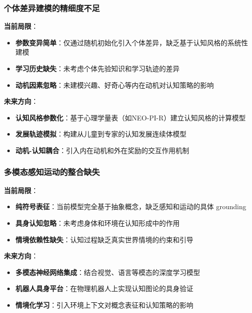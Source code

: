 \documentclass[12pt,a4paper]{article}
\begin{document}
\subsubsection{个体差异建模的精细度不足}

\textbf{当前局限}：
\begin{itemize}
\item \textbf{参数变异简单}：仅通过随机初始化引入个体差异，缺乏基于认知风格的系统性建模
\item \textbf{学习历史缺失}：未考虑个体先验知识和学习轨迹的差异
\item \textbf{动机因素忽略}：未建模兴趣、好奇心等内在动机对认知策略的影响
\end{itemize}

\textbf{未来方向}：
\begin{itemize}
\item \textbf{认知风格参数化}：基于心理学量表（如NEO-PI-R）建立认知风格的计算模型
\item \textbf{发展轨迹模拟}：构建从儿童到专家的认知发展连续体模型
\item \textbf{动机-认知耦合}：引入内在动机和外在奖励的交互作用机制
\end{itemize}

\subsubsection{多模态感知运动的整合缺失}

\textbf{当前局限}：
\begin{itemize}
\item \textbf{纯符号表征}：当前模型完全基于抽象概念，缺乏感知和运动的具体 grounding
\item \textbf{具身认知忽略}：未考虑身体和环境在认知形成中的作用
\item \textbf{情境依赖性缺失}：认知过程缺乏真实世界情境的约束和引导
\end{itemize}

\textbf{未来方向}：
\begin{itemize}
\item \textbf{多模态神经网络集成}：结合视觉、语言等模态的深度学习模型
\item \textbf{机器人具身平台}：在物理机器人上实现认知图论的具身验证
\item \textbf{情境化学习}：引入环境上下文对概念表征和认知策略的影响
\end{itemize}
\end{document}

